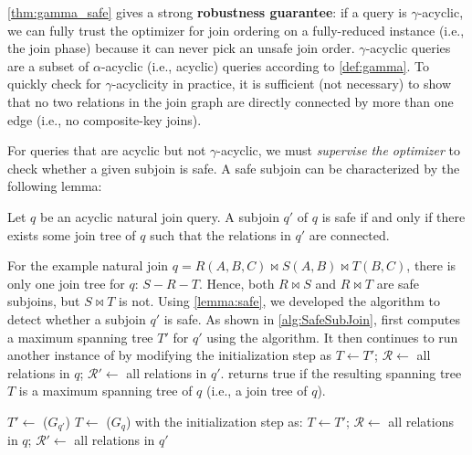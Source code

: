 \cref{thm:gamma_safe} gives a strong \textbf{robustness guarantee}: if a query is $\gamma$-acyclic, we can fully trust the optimizer for join ordering on a fully-reduced instance (i.e., the join phase) because it can never pick an unsafe join order. $\gamma$-acyclic queries are a subset of $\alpha$-acyclic (i.e., acyclic) queries according to \cref{def:gamma}. To quickly check for $\gamma$-acyclicity in practice, it is sufficient (not necessary) to show that no two relations in the join graph are directly connected by more than one edge (i.e., no composite-key joins).


For queries that are acyclic but not $\gamma$-acyclic, we must \emph{supervise the optimizer} to check whether a given subjoin is safe. 
A safe subjoin can be characterized by the following lemma:

\begin{lemma}\label{lemma:safe}
Let $q$ be an acyclic natural join query. A subjoin $q'$ of $q$ is safe if and only if there exists some join tree of $q$ such that the relations in $q'$ are connected.
\end{lemma}

For the example natural join $q = R(A,B,C) \Join S(A,B) \Join T(B,C)$, there is only one join tree for $q$: $S - R - T$. Hence, both $R \Join S$ and $R \Join T$ are safe subjoins, but $S \Join T$ is not. Using \cref{lemma:safe}, we developed the \SafeSubJoin algorithm to detect whether a subjoin $q'$ is safe. As shown in \cref{alg:SafeSubJoin}, \SafeSubJoin first computes a maximum spanning tree $T'$ for $q'$ using the \TreeStruct algorithm. It then continues to run another instance of \TreeStruct by modifying the initialization step as $T \gets T'$; $\mathcal{R} \gets$ all relations in $q$; $\mathcal{R}' \gets$ all relations in $q'$. \SafeSubJoin returns true if the resulting spanning tree $T$ is a maximum spanning tree of $q$ (i.e., a join tree of $q$).

\begin{algorithm}[t!]
    $T' \gets$ \TreeStruct($G_{q'}$)\;
    $T \gets$ \TreeStruct($G_{q}$) with the initialization step as:
    $T \gets T'$; $\mathcal{R} \gets$ all relations in $q$; $\mathcal{R}' \gets$ all relations in $q'$\;
    \caption{\SafeSubJoin}
    \label{alg:SafeSubJoin}
\end{algorithm}